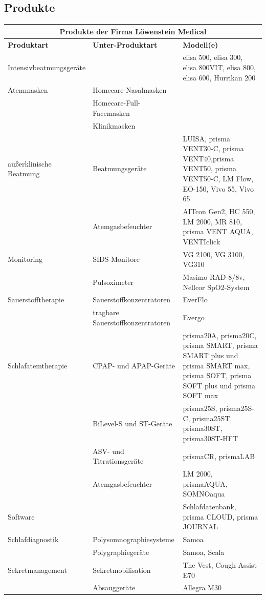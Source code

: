 \documentclass[a4paper, 12pt]{article}
\begin{document}
\subsection{Produkte}\label{products}

\hspace*{-2.5cm} %
\begin{tabular}{|l|m{5cm}|m{8.5cm}|}
\hline
\multicolumn{3}{|c|}{\textbf{Produkte der Firma Löwenstein Medical}} \\
\hline
\hline 
\textbf{Produktart} & \textbf{Unter-Produktart} & \textbf{Modell(e)} \\ 
\hline 
Intensivbeatmungsgeräte &  & elisa 500, elisa 300, elisa 800VIT, elisa 800, elisa 600, Hurrikan 200 \\ 
\hline 
Atemmasken & Homecare-Nasalmasken &  \\ 
\hline
 & Homecare-Full-Facemasken & \\
\hline
 & Klinikmasken & \\
\hline 
außerklinische Beatmung & Beatmungsgeräte & LUISA, prisma VENT30-C, prisma VENT40,prisma VENT50, prisma VENT50-C,	LM Flow, EO-150, Vivo 55, Vivo 65 \\ 
\hline 
 & Atemgasbefeuchter & AITcon Gen2, HC 550, LM 2000, MR 810, prisma VENT AQUA, VENTIclick \\ 
\hline 
Monitoring & SIDS-Monitore & VG 2100, VG 3100, VG310 \\ 
\hline 
 & Pulsoximeter & Masimo RAD-8/8v, Nellcor SpO2-System \\ 
\hline 
Sauerstofftherapie & Sauerstoffkonzentratoren & EverFlo \\ 
\hline 
 & tragbare Sauerstoffkonzentratoren & Evergo \\ 
\hline 
Schlafatemtherapie & CPAP- und APAP-Geräte & prisma20A, prisma20C, prisma SMART, prisma SMART plus und prisma SMART max, prisma SOFT, prisma SOFT plus und prisma SOFT max \\ 
\hline 
 & BiLevel-S und ST-Geräte & prisma25S, prisma25S-C, prisma25ST, prisma30ST, prisma30ST-HFT \\ 
\hline 
 & ASV- und Titrationsgeräte & prismaCR, prismaLAB \\ 
\hline 
 & Atemgasbefeuchter & LM 2000, prismaAQUA, SOMNOaqua \\ 
\hline 
Software &  & Schlafdatenbank, prisma CLOUD, 	prisma JOURNAL \\ 
\hline 
Schlafdiagnostik & Polysomnographiesysteme & Samoa \\ 
\hline 
 & Polygraphiegeräte & Samoa, Scala \\ 
\hline 
Sekretmanagement & Sekretmobilisation & The Vest, Cough Assist E70 \\ 
\hline 
 & Absauggeräte & Allegra M30 \\ 
\hline 
\end{tabular} 
\end{document}
